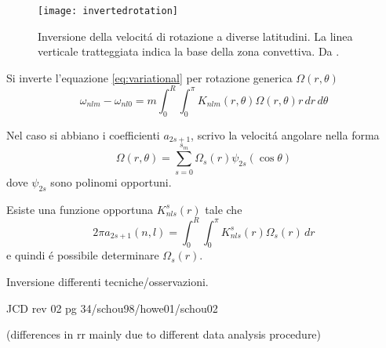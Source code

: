 \documentclass[../main.tex]{subfiles}
\begin{document}
\begin{figure}[!ht]
\centering
\texttt{[image: invertedrotation]}
\caption{Inversione della velocit\'a di rotazione a diverse latitudini. La linea verticale tratteggiata indica la base della zona convettiva. Da \cite{chr02helioseismology}.}\label{fig:inversionerotazione}
\end{figure}

Si inverte l'equazione \eqref{eq:variational} per rotazione generica $\Omega(r,\theta)$
\begin{equation}
\omega_{nlm}-\omega_{nl0}=m\int_0^R\int_0^{\pi}K_{nlm}(r,\theta)\Omega(r,\theta)r\,dr\,d\theta\label{eq:invrot2D}
\end{equation}

Nel caso si abbiano i coefficienti $a_{2s+1}$, scrivo la velocit\'a angolare nella forma
\begin{equation}
\Omega(r,\theta)=\sum_{s=0}^{s_m}\Omega_{s}(r)\psi_{2s}(\cos{\theta})\label{eq:angularv15}
\end{equation}
dove $\psi_{2s}$ sono polinomi opportuni.

Esiste una funzione opportuna $K_{nls}^{s}(r)$ tale che
\begin{equation}
2\pi a_{2s+1}(n,l)=\int_0^R\int_0^{\pi}K_{nls}^{s}(r)\Omega_s(r)\,dr
\end{equation}
e quindi \'e possibile determinare $\Omega_s(r)$.

\begin{workout}Inversione differenti tecniche/osservazioni.

JCD rev 02 pg 34/schou98/howe01/schou02

(differences in rr mainly due to different data analysis procedure)

\end{workout}
\end{document}
